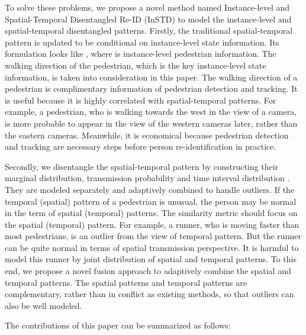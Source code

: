 \documentclass[10pt,twocolumn,letterpaper]{article}
\begin{document}
To solve these problems, we propose a novel method named Instance-level and Spatial-Temporal Disentangled Re-ID (InSTD) to model the instance-level and spatial-temporal disentangled patterns.
Firstly, the traditional spatial-temporal pattern is updated to be conditional on instance-level state information.
Its formulation looks like , where  is instance-level pedestrian information.
The walking direction of the pedestrian, which is the key instance-level state information, is taken into consideration in this paper.
The walking direction of a pedestrian is complimentary information of pedestrian detection and tracking.
It is useful because it is highly correlated with spatial-temporal patterns.
For example, a pedestrian, who is walking towards the west in the view of a camera, is more probable to appear in the view of the western cameras later, rather than the eastern cameras.
Meanwhile, it is economical because pedestrian detection and tracking are necessary steps before person re-identification in practice.












Secondly, we disentangle the spatial-temporal pattern by constructing their marginal distribution, \ie transmission probability  and time interval distribution .
They are modeled separately and adaptively combined to handle outliers.
If the temporal (spatial) pattern of a pedestrian is unusual, the person may be normal in the term of spatial (temporal) patterns. The similarity metric should focus on the spatial (temporal) pattern.
For example, a runner, who is moving faster than most pedestrians, is an outlier from the view of temporal pattern. But the runner can be quite normal in terms of spatial transmission perspective.
It is harmful to model this runner by joint distribution of spatial and temporal patterns.
To this end, we propose a novel fusion approach to adaptively combine the spatial and temporal patterns.
The spatial patterns and temporal patterns are complementary, rather than in conflict as existing methods, so that outliers can also be well modeled.






The contributions of this paper can be summarized as follows:
\end{document}
